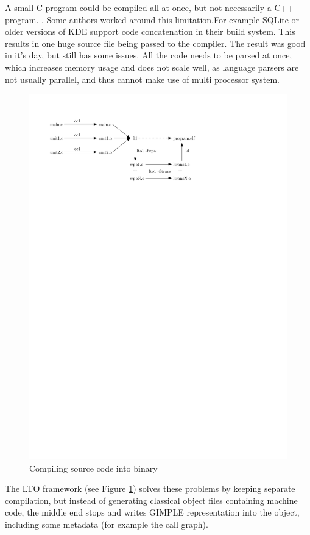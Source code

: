A small C program could be compiled all at once, but not necessarily a C++
program. . Some authors worked around this
limitation.For example SQLite or older versions of KDE support code
concatenation in their build system. This results in one huge source file being
passed to the compiler. The result was good in it's day, but still has some
issues. All the code needs to be parsed at once, which increases memory usage
and does not scale well, as language parsers are not usually parallel, and thus
cannot make use of multi processor system.

\begin{figure}[h!]
	\label{figure-lto-workflow}
	\centering
	\includegraphics{./img/lto-workflow.pdf}
	\caption{Compiling source code into binary}
\end{figure}

The LTO framework (see Figure \ref{figure-lto-workflow}) solves these problems by keeping separate compilation, but
instead of generating classical object files containing machine code, the
middle end stops and writes GIMPLE representation into the object, including
some metadata (for example the call graph).

